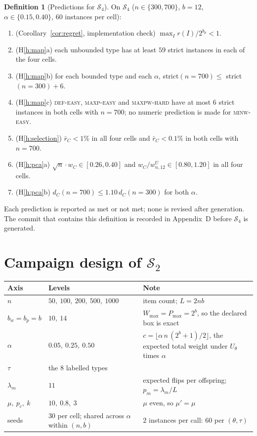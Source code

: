 \documentclass[a4paper,11pt]{article}
\newcommand{\Wmax}{W_{\max}}
\newcommand{\Pmax}{P_{\max}}
\newcommand{\bw}{b_{w}}
\newcommand{\bp}{b_{p}}
\newcommand{\Utheta}{U_{\theta}}
\newcommand{\DEF}{\textsc{def}}
\newcommand{\MAXP}{\textsc{maxp}}
\newcommand{\MAXPW}{\textsc{maxpw}}
\newcommand{\MINW}{\textsc{minw}}
\theoremstyle{plain}
\theoremstyle{definition}
\newtheorem{definition}{Definition}
\theoremstyle{remark}
\begin{document}
\begin{definition}[Predictions for $\mathcal S_4$]\label{def:prereg}
On $\mathcal S_4$ ($n\in\{300,700\}$, $b=12$, $\alpha\in\{0.15,0.40\}$, $60$ instances per cell):
\begin{enumerate}[label=\textbf{R\arabic*},leftmargin=2.6em,itemsep=2pt]
\item (Corollary~\ref{cor:regret}, implementation check) $\max_I r(I)/2^{\bp}<1$.
\item (H\ref{h:map}a) each unbounded type has at least $59$ strict instances in each of the four cells.
\item (H\ref{h:map}b) for each bounded type and each $\alpha$, strict$(n{=}700)\le$ strict$(n{=}300)+6$.
\item (H\ref{h:map}c) \DEF-\textsc{easy}, \MAXP-\textsc{easy} and \MAXPW-\textsc{hard} have at most $6$ strict instances in both cells with $n=700$; no numeric prediction is made for \MINW-\textsc{easy}.
\item (H\ref{h:selection}) $\bar r_C<1\%$ in all four cells and $\bar r_C<0.1\%$ in both cells with $n=700$.
\item (H\ref{h:pca}a) $\sqrt n\cdot w_C\in[0.26,0.40]$ and $w_C/w^{U}_{n,12}\in[0.80,1.20]$ in all four cells.
\item (H\ref{h:pca}b) $d_C(n{=}700)\le1.10\,d_C(n{=}300)$ for both $\alpha$.
\end{enumerate}
Each prediction is reported as met or not met; none is revised after generation. The commit
that contains this definition is recorded in Appendix~D before $\mathcal S_4$ is generated.
\end{definition}

\section{Campaign design of $\mathcal S_2$}\label{sec:design}

\begin{center}\small
\begin{tabular}{@{}lp{4.4cm}p{7.4cm}@{}}
\toprule
Axis & Levels & Note \\
\midrule
$n$ & $50,\ 100,\ 200,\ 500,\ 1000$ & item count; $L=2nb$ \\
$\bw=\bp=b$ & $10,\ 14$ & $\Wmax=\Pmax=2^{b}$, so the declared box is exact \\
$\alpha$ & $0.05,\ 0.25,\ 0.50$ & $c=\lfloor\alpha\,n\,(2^{b}+1)/2\rfloor$, the expected total weight under $\Utheta$ times $\alpha$ \\
$\tau$ & the $8$ labelled types & \\
$\lambda_m$ & $11$ & expected flips per offspring; $p_m=\lambda_m/L$ \\
$\mu,\ p_c,\ k$ & $10,\ 0.8,\ 3$ & $\mu$ even, so $\mu'=\mu$ \\
seeds & $30$ per cell; shared across $\alpha$ within $(n,b)$ & $2$ instances per call: $60$ per $(\theta,\tau)$ \\
\bottomrule
\end{tabular}
\end{center}
\end{document}
